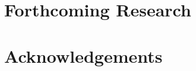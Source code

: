\documentclass{a0poster}
\begin{document}
\begin{multicols}{3}
\color{DarkSlateGray} %


\section{Forthcoming Research}




\nocite{*} %


\section{Acknowledgements}


\end{multicols}
\end{document}
